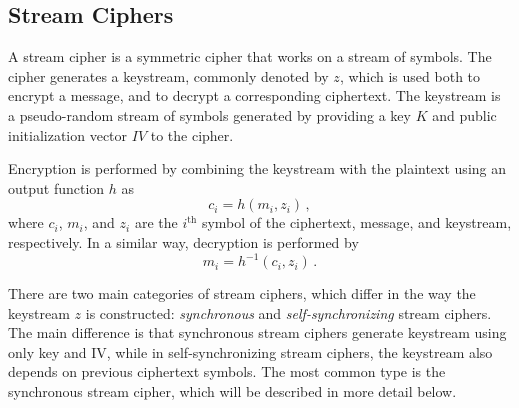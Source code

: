 \subsection{Stream Ciphers} \label{sec:kappa-streamciphers}

A stream cipher is a symmetric cipher that works on a stream of symbols.
The cipher generates a keystream, commonly denoted by $z$, which is used both to encrypt a message, and to decrypt a corresponding ciphertext.
The keystream is a pseudo-random stream of symbols generated by providing a key $K$ and public initialization vector $IV$ to the cipher.

Encryption is performed by combining the keystream with the plaintext using an output function $h$ as
\begin{equation} \label{eq:kappa-streamcipherencrypt}
	c_i = h(m_i, z_i) \,,
\end{equation}
where $c_i$, $m_i$, and $z_i$ are the $i^{\text{th}}$ symbol of the ciphertext, message, and keystream, respectively.
In a similar way, decryption is performed by
\begin{equation} \label{eq:kappa-streamcipherdecrypt}
	m_i = h^{-1}(c_i, z_i) \,.
\end{equation}

There are two main categories of stream ciphers, which differ in the way the keystream $z$ is constructed: \emph{synchronous} and \emph{self-synchronizing} stream ciphers.
The main difference is that synchronous stream ciphers generate keystream using only key and IV, while in self-synchronizing stream ciphers, the keystream also depends on previous ciphertext symbols.
The most common type is the synchronous stream cipher, which will be described in more detail below.

